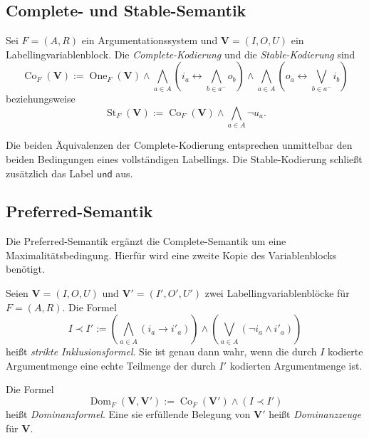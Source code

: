 \subsection{Complete- und Stable-Semantik}

\begin{Definition}
    \label{def:co-st-encodings}
    Sei \(F=(A,R)\) ein Argumentationssystem und
    \(\mathbf V=(I,O,U)\) ein Labellingvariablenblock. Die
    \emph{Complete-Kodierung} und die \emph{Stable-Kodierung} sind
    \[
        \operatorname{Co}_F(\mathbf V)
        :=
        \operatorname{One}_F(\mathbf V)
        \land
        \bigwedge_{a\in A}
        \left(
            i_a\leftrightarrow
            \bigwedge_{b\in a^-}o_b
        \right)
        \land
        \bigwedge_{a\in A}
        \left(
            o_a\leftrightarrow
            \bigvee_{b\in a^-}i_b
        \right)
    \]
    beziehungsweise
    \[
        \operatorname{St}_F(\mathbf V)
        :=
        \operatorname{Co}_F(\mathbf V)
        \land
        \bigwedge_{a\in A}\neg u_a.
    \]
\end{Definition}

Die beiden Äquivalenzen der Complete-Kodierung entsprechen unmittelbar den
beiden Bedingungen eines vollständigen Labellings. Die Stable-Kodierung
schließt zusätzlich das Label \(\mathsf{und}\) aus.

\subsection{Preferred-Semantik}

Die Preferred-Semantik ergänzt die Complete-Semantik um eine
Maximalitätsbedingung. Hierfür wird eine zweite Kopie des Variablenblocks
benötigt.

\begin{Definition}
    \label{def:strict-inclusion-and-dominator}
    Seien \(\mathbf V=(I,O,U)\) und
    \(\mathbf V'=(I',O',U')\) zwei Labellingvariablenblöcke für
    \(F=(A,R)\). Die Formel
    \[
        I\prec I'
        :=
        \left(
            \bigwedge_{a\in A}(i_a\rightarrow i'_a)
        \right)
        \land
        \left(
            \bigvee_{a\in A}(\neg i_a\land i'_a)
        \right)
    \]
    heißt \emph{strikte Inklusionsformel}. Sie ist genau dann wahr, wenn
    die durch \(I\) kodierte Argumentmenge eine echte Teilmenge der durch
    \(I'\) kodierten Argumentmenge ist.

    Die Formel
    \[
        \operatorname{Dom}_F(\mathbf V,\mathbf V')
        :=
        \operatorname{Co}_F(\mathbf V')\land(I\prec I')
    \]
    heißt \emph{Dominanzformel}. Eine sie erfüllende Belegung von
    \(\mathbf V'\) heißt \emph{Dominanzzeuge} für \(\mathbf V\).
\end{Definition}

